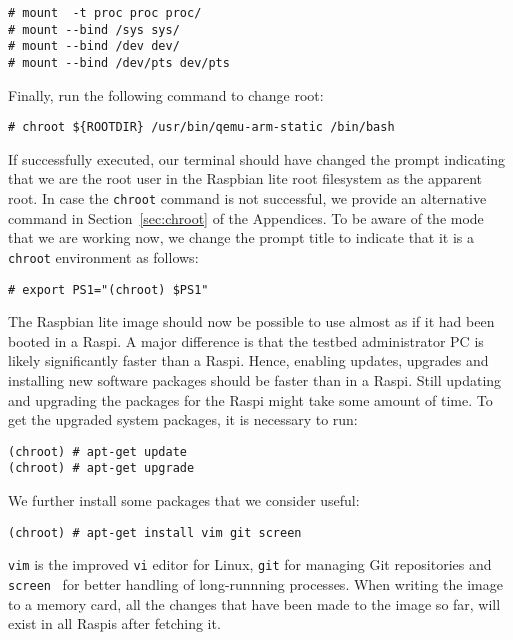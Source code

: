 \begin{lstlisting}[]
# mount  -t proc proc proc/
# mount --bind /sys sys/
# mount --bind /dev dev/
# mount --bind /dev/pts dev/pts
\end{lstlisting}
\FloatBarrier
\vspace{-5mm}

Finally, run the following command to change root:

\begin{lstlisting}[]
# chroot ${ROOTDIR} /usr/bin/qemu-arm-static /bin/bash
\end{lstlisting}
\FloatBarrier
\vspace{-5mm}

If successfully executed, our terminal should have changed the prompt
indicating that we are the root user in the Raspbian lite root filesystem as
the apparent root. In case the \texttt{chroot} command is not successful,
we provide an alternative command in Section~\ref{sec:chroot} of the Appendices.
To be aware of the mode that we are working now, we change
the prompt title to indicate that it is a \texttt{chroot} environment as
follows:

\begin{lstlisting}[]
# export PS1="(chroot) $PS1"
\end{lstlisting}
\FloatBarrier
\vspace{-5mm}

The Raspbian lite image should now be possible to use almost as if it had
been booted in a \ac{Raspi}. A major difference is that the testbed
administrator \ac{PC} is likely significantly faster than a \ac{Raspi}.
Hence, enabling updates, upgrades and installing new software packages
should be faster than in a \ac{Raspi}. Still updating and upgrading
the packages for the \ac{Raspi} might take some amount of time. To get
the upgraded system packages, it is necessary to run:

\begin{lstlisting}[]
(chroot) # apt-get update
(chroot) # apt-get upgrade
\end{lstlisting}
\FloatBarrier
\vspace{-5mm}

We further install some packages that we consider useful:
\begin{lstlisting}[]
(chroot) # apt-get install vim git screen
\end{lstlisting}
\FloatBarrier
\vspace{-5mm}

\texttt{vim} is the improved \texttt{vi} editor for Linux, \texttt{git}
for managing Git repositories and \texttt{screen}~\cite{gnu_screen} for better handling of
long-runnning processes. When writing the image to a memory card, all the
changes that have been made to the image so far, will exist in all
\ac{Raspi}s after fetching it.

